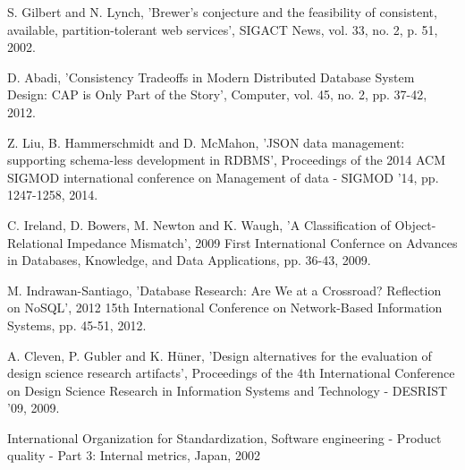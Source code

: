 \begin{thebibliography}{69}



 S.  Gilbert and N.  Lynch, 'Brewer's conjecture and the feasibility of consistent, available, partition-tolerant web services', SIGACT News, vol. 33, no. 2, p. 51, 2002.

 D.  Abadi, 'Consistency Tradeoffs in Modern Distributed Database System Design: CAP is Only Part of the Story', Computer, vol. 45, no. 2, pp. 37-42, 2012.

Z.  Liu, B.  Hammerschmidt and D.  McMahon, 'JSON data management: supporting schema-less development in RDBMS', Proceedings of the 2014 ACM SIGMOD international conference on Management of data - SIGMOD '14, pp. 1247-1258, 2014.


 C.  Ireland, D.  Bowers, M.  Newton and K.  Waugh, 'A Classification of Object-Relational Impedance Mismatch', 2009 First International Confernce on Advances in Databases, Knowledge, and Data Applications, pp. 36-43, 2009.

 M.  Indrawan-Santiago, 'Database Research: Are We at a Crossroad? Reflection on NoSQL', 2012 15th International Conference on Network-Based Information Systems, pp. 45-51, 2012.

 A.  Cleven, P.  Gubler and K.  Hüner, 'Design alternatives for the evaluation of design science research artifacts', Proceedings of the 4th International Conference on Design Science Research in Information Systems and Technology - DESRIST '09, 2009.

 International Organization for Standardization, Software engineering - Product quality - Part 3: Internal metrics, Japan, 2002


\end{thebibliography}
